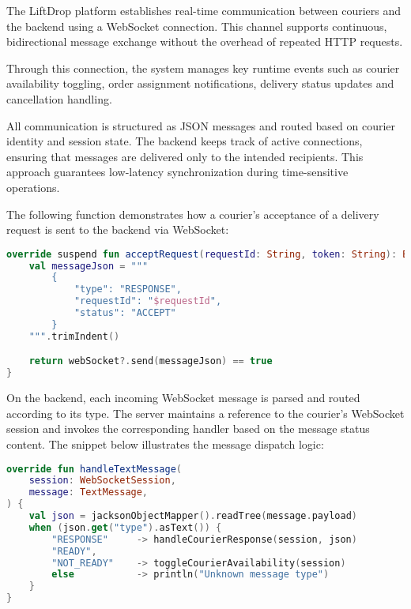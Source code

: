The LiftDrop platform establishes real-time communication between couriers and the backend using a WebSocket connection. This channel supports continuous, bidirectional message exchange without the overhead of repeated HTTP requests.

Through this connection, the system manages key runtime events such as courier availability toggling, order assignment notifications, delivery status updates and cancellation handling.

All communication is structured as JSON messages and routed based on courier identity and session state. The backend keeps track of active connections, ensuring that messages are delivered only to the intended recipients. This approach guarantees low-latency synchronization during time-sensitive operations.

The following function demonstrates how a courier's acceptance of a delivery request is sent to the backend via WebSocket:

\begin{lstlisting}[language=Kotlin, 
  basicstyle=\ttfamily\small, 
  lineskip=-0.1pt,
  caption={Sending an acceptance message via WebSocket}]
override suspend fun acceptRequest(requestId: String, token: String): Boolean {
    val messageJson = """
        {
            "type": "RESPONSE",
            "requestId": "$requestId",
            "status": "ACCEPT"
        }
    """.trimIndent()

    return webSocket?.send(messageJson) == true
}
\end{lstlisting}


On the backend, each incoming WebSocket message is parsed and routed according to its type. The server maintains a reference to the courier’s WebSocket session and invokes the corresponding handler based on the message status content. The snippet below illustrates the message dispatch logic:

\begin{lstlisting}[language=Kotlin, caption={Backend handling of incoming WebSocket messages}]
override fun handleTextMessage(
    session: WebSocketSession,
    message: TextMessage,
) {
    val json = jacksonObjectMapper().readTree(message.payload)
    when (json.get("type").asText()) {
        "RESPONSE"     -> handleCourierResponse(session, json)
        "READY", 
        "NOT_READY"    -> toggleCourierAvailability(session)
        else           -> println("Unknown message type")
    }
}
\end{lstlisting}

